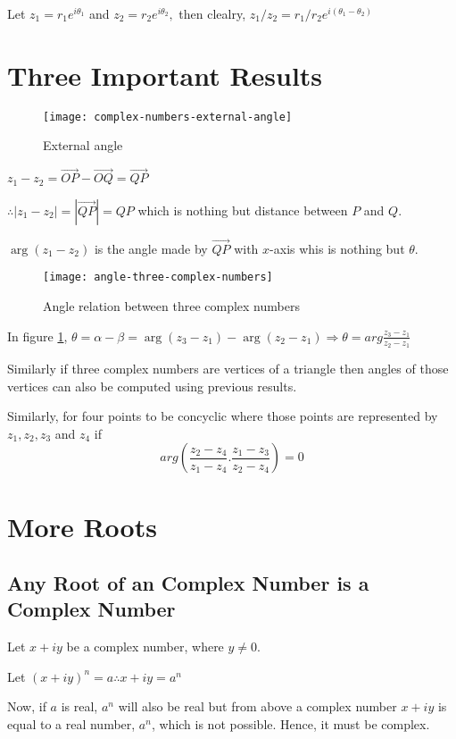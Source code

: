 Let $z_1 = r_1e^{i\theta_1}$ and $z_2 = r_2e^{i\theta_2},$ then clealry, $z_1/z_2 = r_1/r_2e^{i(\theta_1 - \theta_2)}$

\section{Three Important Results}
\begin{figure}[!h]
  \begin{center}
    \texttt{[image: complex-numbers-external-angle]}
    \caption{External angle}
  \end{center}
\end{figure}
$z_1 - z_2 = \overrightarrow{OP} - \overrightarrow{OQ} = \overrightarrow{QP}$

$\therefore |z_1 - z_2| = |\overrightarrow{QP}| = QP$ which is nothing but distance between $P$ and $Q.$

$\arg(z_1 - z_2)$ is the angle made by $\overrightarrow{QP}$ with $x$-axis whis is nothing but $\theta.$
\begin{figure}[h]
  \begin{center}
    \texttt{[image: angle-three-complex-numbers]}
    \caption{Angle relation between three complex numbers}
    \label{fig:arbtcn}
  \end{center}
\end{figure}

In figure \ref{fig:arbtcn}, $\theta = \alpha - \beta = \arg(z_3 - z_1) - \arg(z_2 - z_1) \Rightarrow \theta = arg\frac{z_3 - z_1}{z_2 - z_1}$

Similarly if three complex numbers are vertices of a triangle then angles of those vertices can also be computed using previous
results.

Similarly, for four points to be concyclic where those points are represented by $z_1, z_2, z_3$ and $z_4$ if
$$arg\left(\frac{z_2 - z_4}{z_1 - z_4}.\frac{z_1 - z_3}{z_2 - z_4}\right) = 0$$

\section{More Roots}
\subsection{Any Root of an Complex Number is a Complex Number}
Let $x + iy$ be a complex number, where $y \neq 0$.

Let $(x +iy)^n = a\therefore x + iy = a^n$

Now, if $a$ is real, $a^n$ will also be real but from above a complex number $x + iy$ is equal to a real number, $a^n$, which is
not possible. Hence, it must be complex.

